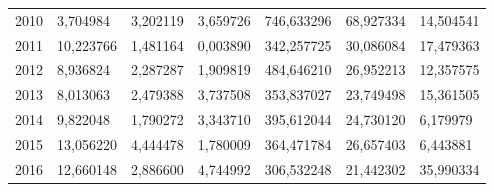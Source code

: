 \begin{table}
\begin{tabular}{p{1cm}p{2cm}p{2cm}p{2cm}p{2cm}p{2cm}p{2cm}}
 2010 &                               3,704984 &                 3,202119 &         3,659726 &                746,633296 &                                68,927334 & 14,504541 \\
 2011 &                              10,223766 &                 1,481164 &         0,003890 &                342,257725 &                                30,086084 & 17,479363 \\
 2012 &                               8,936824 &                 2,287287 &         1,909819 &                484,646210 &                                26,952213 & 12,357575 \\
 2013 &                               8,013063 &                 2,479388 &         3,737508 &                353,837027 &                                23,749498 & 15,361505 \\
 2014 &                               9,822048 &                 1,790272 &         3,343710 &                395,612044 &                                24,730120 &  6,179979 \\
 2015 &                              13,056220 &                 4,444478 &         1,780009 &                364,471784 &                                26,657403 &  6,443881 \\
 2016 &                              12,660148 &                 2,886600 &         4,744992 &                306,532248 &                                21,442302 & 35,990334 \\
\bottomrule
\end{tabular}
\end{table}
